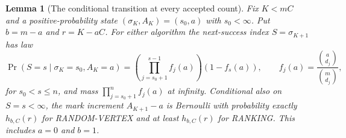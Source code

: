 \documentclass[11pt]{article}
\newtheorem{lemma}{Lemma}
\begin{document}
\begin{lemma}[The conditional transition at every accepted count]
\label{lem:allhistory}
Fix $K<mC$ and a positive-probability state
$(\sigma_K,A_K)=(s_0,a)$ with $s_0<\infty$.
Put $b=m-a$ and $r=K-aC$.
For either algorithm the next-success index $S=\sigma_{K+1}$ has law
\begin{equation}\label{eq:waitingkernel}
 \Pr(S=s\mid\sigma_K=s_0,A_K=a)=
 \left(\prod_{j=s_0+1}^{s-1} f_j(a)\right)(1-f_s(a)),
 \qquad f_j(a)=\frac{\binom a{d_j}}{\binom m{d_j}},
\end{equation}
for $s_0<s\leq n$, and mass
$\prod_{j=s_0+1}^n f_j(a)$ at infinity.
Conditional also on $S=s<\infty$, the mark increment
$A_{K+1}-a$ is Bernoulli with probability exactly $h_{b,C}(r)$
for RANDOM-VERTEX and at least $h_{b,C}(r)$ for RANKING.
This includes $a=0$ and $b=1$.
\end{lemma}
\end{document}
